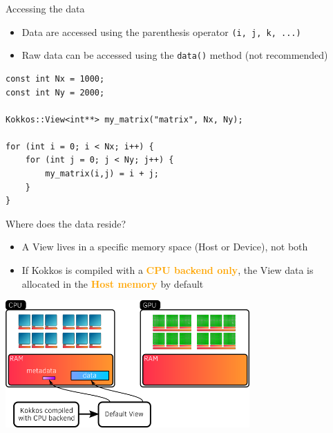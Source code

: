 \documentclass[aspectratio=169]{beamer}
\newcommand{\highlight}[1]{\textcolor{orange}{\textbf{#1}}}
\begin{document}

\begin{frame}[fragile]{Accessing the data}
    \begin{itemize}
        \item Data are accessed using the parenthesis operator \texttt{(i, j, k, ...)}
        \item Raw data can be accessed using the \texttt{data()} method (not recommended)
    \end{itemize}
    \begin{verbatim}
const int Nx = 1000;
const int Ny = 2000;

Kokkos::View<int**> my_matrix("matrix", Nx, Ny);

for (int i = 0; i < Nx; i++) {
    for (int j = 0; j < Ny; j++) {
        my_matrix(i,j) = i + j;
    }
}
    \end{verbatim}
\end{frame}


\begin{frame}{Where does the data reside?}
    \begin{itemize}
        \item A View lives in a specific memory space (Host or Device), not both
        \item If Kokkos is compiled with a \highlight{CPU backend only}, the View data is allocated in the \highlight{Host memory} by default
    \end{itemize}
    \begin{center}
        \includegraphics[width=0.7\textwidth]{host_view_memory.png}
    \end{center}
\end{frame}

\end{document}

